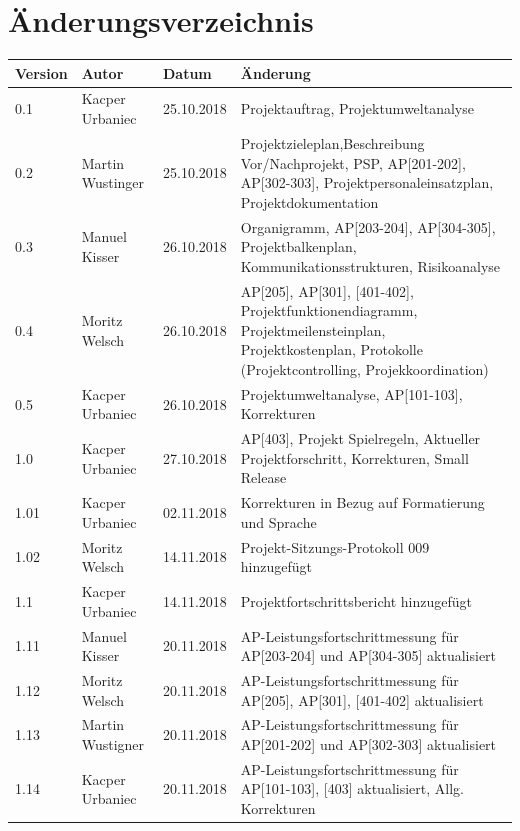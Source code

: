 \section*{Änderungsverzeichnis}
\begin{center}
\begin{tabularx}{\textwidth}{| l | p{1.8cm} | l | X |}
\hline \rowcolor{gray} \textbf{\color{white}Version} & \textbf{\color{white}Autor} & \textbf{\color{white}Datum} &  \textbf{\color{white}Änderung} \\ 
 \hline \hline
 0.1 & Kacper Urbaniec & 25.10.2018 & Projektauftrag, Projektumweltanalyse\\
 \hline
 0.2 & Martin Wustinger & 25.10.2018 & Projektzieleplan,\:Beschreibung Vor/Nachprojekt, PSP, AP[201-202], AP[302-303], Projektpersonaleinsatzplan, Projektdokumentation\\
 \hline
 0.3 & Manuel Kisser & 26.10.2018 & Organigramm, AP[203-204], AP[304-305], Projektbalkenplan, Kommunikationsstrukturen, Risikoanalyse\\
 \hline 
 0.4 & Moritz Welsch & 26.10.2018 & AP[205], AP[301], [401-402], Projektfunktionendiagramm, Projektmeilensteinplan, Projektkostenplan, Protokolle (Projektcontrolling, Projekkoordination)\\
 \hline 
 0.5 & Kacper Urbaniec & 26.10.2018 & Projektumweltanalyse, AP[101-103], Korrekturen \\
 \hline
 1.0 & Kacper Urbaniec  & 27.10.2018 & AP[403], Projekt Spielregeln, Aktueller Projektforschritt, Korrekturen, Small Release\\
 \hline
  1.01 & Kacper Urbaniec  & 02.11.2018 & Korrekturen in Bezug auf Formatierung und Sprache\\
  \hline
  1.02 & Moritz Welsch & 14.11.2018 & Projekt-Sitzungs-Protokoll 009 hinzugefügt\\
 \hline
 1.1 & Kacper Urbaniec & 14.11.2018 & Projektfortschrittsbericht hinzugefügt\\
 \hline
  1.11 & Manuel Kisser & 20.11.2018 & AP-Leistungsfortschrittmessung für AP[203-204] und AP[304-305] aktualisiert\\
 \hline
 1.12 & Moritz Welsch & 20.11.2018 & AP-Leistungsfortschrittmessung für AP[205], AP[301], [401-402] aktualisiert\\
 \hline
 1.13 & Martin Wustigner & 20.11.2018 & AP-Leistungsfortschrittmessung für AP[201-202] und AP[302-303] aktualisiert\\
 \hline
 1.14 & Kacper Urbaniec & 20.11.2018 & AP-Leistungsfortschrittmessung für AP[101-103], [403] aktualisiert, Allg. Korrekturen\\
 \hline
\end{tabularx}
\end{center}

